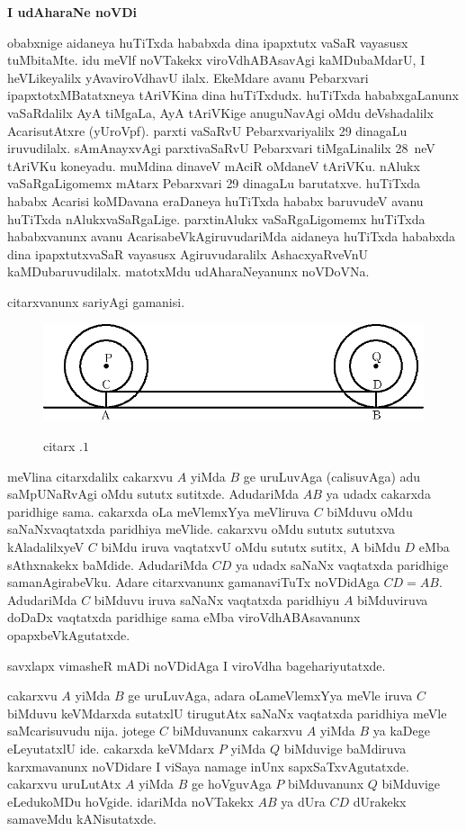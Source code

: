 {\bf I udAharaNe noVDi}

obabxnige aidaneya huTiTxda hababxda dina ipapxtutx vaSaR vayasusx tuMbitaMte. idu meVlf noVTakekx viroVdhABAsavAgi kaMDubaMdarU, I heVLikeyalilx yAva\break viroVdhavU ilalx. EkeMdare avanu Pebarxvari ipapxtotxMBatatxneya tAriVKina dina huTiTxdudx. huTiTxda hababxgaLanunx vaSaRdalilx AyA tiMgaLa, AyA tAriVKige anuguNa\-vAgi oMdu deVshadalilx AcarisutAtxre (yUroVpf). parxti vaSaRvU Pebarxvariyalilx {\rm 29} dinagaLu iruvudilalx. sAmAnayxvAgi parxtivaSaRvU Pebarxvari tiMgaLinalilx {\rm 28}~neV tAriVKu koneyadu. muMdina dinaveV mAciR oMdaneV tAriVKu. nAlukx vaSaRgaLigomemx mAtarx Pebarxvari {\rm 29} dinagaLu barutatxve. huTiTxda hababx Acarisi koMDavana eraDaneya huTiTxda hababx baruvudeV avanu huTiTxda nAlukxvaSaRgaLige. parxtinAlukx vaSaRgaLigomemx huTiTxda hababxvanunx avanu AcarisabeVkAgiruvudariMda aidaneya huTiTxda hababxda dina ipapxtutxvaSaR vayasusx Agiruvudaralilx AshacxyaRveVnU kaMDubaruvudilalx. matotxMdu udAharaNeyanunx noVDoVNa.

citarxvanunx sariyAgi gamanisi.
\begin{figure}[H]
\centering
\includegraphics[scale=.65]{src/figures/083.eps}\\[-0.4cm]
\caption*{citarx .$1$} 
\end{figure}

meVlina citarxdalilx cakarxvu $A$ yiMda $B$ ge uruLuvAga (calisuvAga) adu saMpUNaRvAgi oMdu sututx sutitxde. AdudariMda $AB$ ya udadx cakarxda paridhige sama. cakarxda oLa meVlemxYya meVliruva $C$ biMduvu oMdu saNaNxvaqtatxda paridhiya meVlide. cakarxvu oMdu sututx sututxva kAladalilxyeV $C$ biMdu iruva vaqtatxvU oMdu sututx sutitx, A biMdu $D$ eMba sAthxnakekx baMdide. AdudariMda $CD$ ya udadx saNaNx vaqtatxda paridhige samanAgirabeVku. Adare citarxvanunx gamanaviTuTx noVDidAga $CD=AB$. AdudariMda $C$ biMduvu iruva saNaNx vaqtatxda paridhiyu $A$ biMduviruva doDaDx vaqtatxda paridhige sama eMba viroVdhABAsavanunx opapxbeVkAgutatxde.

savxlapx vimasheR mADi noVDidAga I viroVdha bagehariyutatxde.

cakarxvu $A$ yiMda $B$ ge uruLuvAga, adara oLameVlemxYya meVle iruva $C$ biMduvu keVMdarxda sutatxlU tirugutAtx saNaNx vaqtatxda paridhiya meVle saMcarisuvudu nija. jotege $C$ biMduvanunx cakarxvu $A$ yiMda $B$ ya kaDege eLeyutatxlU ide. cakarxda keVMdarx $P$ yiMda $Q$ biMduvige baMdiruva karxmavanunx noVDidare I viSaya namage inUnx sapxSaTxvAgutatxde. cakarxvu uruLutAtx $A$ yiMda $B$ ge hoVguvAga $P$ biMduvanunx $Q$ biMduvige eLedukoMDu hoVgide. idariMda noVTakekx $AB$ ya dUra $CD$ dUrakekx samaveMdu kANisutatxde. 

